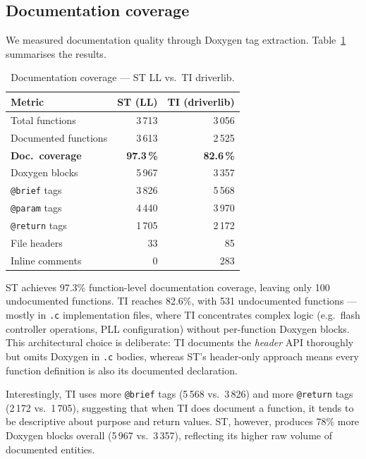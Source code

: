 \subsection{Documentation coverage}
\label{subsec:ti-doc}

We measured documentation quality through Doxygen tag extraction.
Table~\ref{tab:ti-doc} summarises the results.

\begin{table}[H]
\centering
\caption{Documentation coverage --- ST LL vs.\ TI driverlib.}
\label{tab:ti-doc}
\begin{tabular}{l r r}
\toprule
\textbf{Metric} & \textbf{ST (LL)} & \textbf{TI (driverlib)} \\
\midrule
Total functions         &   3\,713 &   3\,056 \\
Documented functions    &   3\,613 &   2\,525 \\
\textbf{Doc.\ coverage} & \textbf{97.3\,\%} & \textbf{82.6\,\%} \\
\midrule
Doxygen blocks          &   5\,967 &   3\,357 \\
\texttt{@brief} tags    &   3\,826 &   5\,568 \\
\texttt{@param} tags    &   4\,440 &   3\,970 \\
\texttt{@return} tags   &   1\,705 &   2\,172 \\
File headers            &      33  &      85  \\
Inline comments         &       0  &     283  \\
\bottomrule
\end{tabular}
\end{table}

ST achieves 97.3\% function-level documentation coverage, leaving only 100 undocumented
functions. TI reaches 82.6\%, with 531 undocumented functions --- mostly in \texttt{.c}
implementation files, where TI concentrates complex logic (e.g.\ flash controller
operations, PLL configuration) without per-function Doxygen blocks. This architectural
choice is deliberate: TI documents the \emph{header} API thoroughly but omits Doxygen in
\texttt{.c} bodies, whereas ST's header-only approach means every function definition is
also its documented declaration.

Interestingly, TI uses more \texttt{@brief} tags (5\,568 vs.\ 3\,826) and more
\texttt{@return} tags (2\,172 vs.\ 1\,705), suggesting that when TI does document a
function, it tends to be descriptive about purpose and return values. ST, however, produces
78\% more Doxygen blocks overall (5\,967 vs.\ 3\,357), reflecting its higher raw volume of
documented entities.

